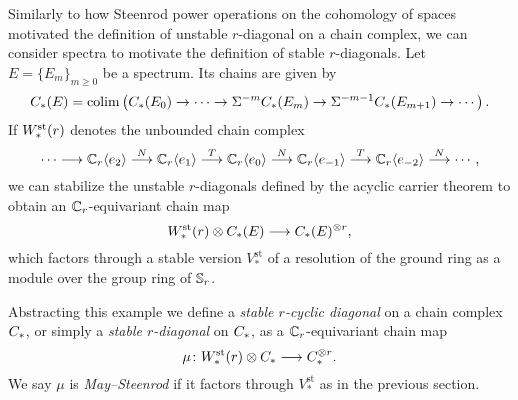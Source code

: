 Similarly to how Steenrod power operations on the cohomology of spaces motivated the definition of unstable $r$-diagonal on a chain complex, we can consider spectra to motivate the definition of stable $r$-diagonals.
Let $E = \{E_m\}_{m \geq 0}$ be a spectrum. Its chains are given by
\[
C_{*}(E) = \operatorname*{colim} \left(C_{*}(E_0) \to \dots \to \Sigma^{-m}C_{*}(E_m) \to \Sigma^{-m-1} C_{*}(E_{m+1}) \to \dotsb\right).
\]
If $W^{\mathrm{st}}_{*}(r)$ denotes the unbounded chain complex
\[
\dotsb \longrightarrow \mathbb{C}_r\langle e_2\rangle \overset{N}{\longrightarrow}
\mathbb{C}_r\langle e_1\rangle \overset{T}{\longrightarrow}
\mathbb{C}_r\langle e_0\rangle \overset{N}{\longrightarrow}
\mathbb{C}_r\langle e_{-1}\rangle \overset{T}{\longrightarrow}
\mathbb{C}_r\langle e_{-2}\rangle \overset{N}{\longrightarrow}
\dotsb,
\]
we can stabilize the unstable $r$-diagonals defined by the acyclic carrier theorem to obtain an $\mathbb{C}_r$-equivariant chain map
\[
W^{\mathrm{st}}_{*}(r) \otimes C_{*}(E) \longrightarrow C_{*}(E)^{\otimes r},
\]
which factors through a stable version $V_*^\mathrm{st}$ of a resolution of the ground ring as a module over the group ring of $\mathbb{S}_r$.

Abstracting this example we define a \emph{stable $r$-cyclic diagonal} on a chain complex $C_{*}$, or simply a \textit{stable $r$-diagonal} on $C_{*}$, as a $\mathbb{C}_r$-equivariant chain map
\[
\mu \colon W^{\mathrm{st}}_{*}(r) \otimes C_{*} \longrightarrow C_{*}^{\otimes r}.
\]
We say $\mu$ is \textit{May--Steenrod} if it factors through $V_*^\mathrm{st}$ as in the previous section.



